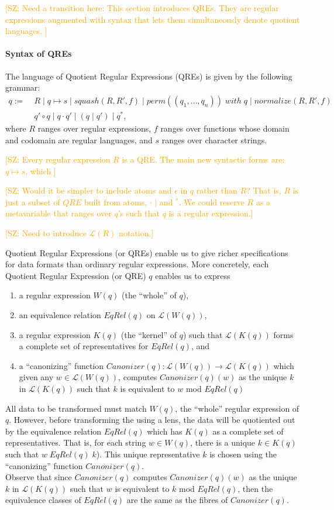 \documentclass{svproc}
\newcommand{\FINISH}[3]{\ifdraft\textcolor{#1}{[#2: #3]}\fi}
\newcommand{\saz}[1]{\FINISH{orange}{SZ}{#1}}
\newcommand{\squash}[3]{\ensuremath{\mathit{squash}(#1, #2, #3)}}
\newcommand{\perm}[2]{\ensuremath{\mathit{perm}(#1)\; \mathit{with}\; #2}}
\newcommand{\normalize}[3]{\ensuremath{\mathit{normalize}(#1, #2, #3)}}
\newcommand{\sep}{\ensuremath{\; | \;}}
\begin{document}
\saz{Need a transition here:  This section introduces QREs.  They are regular
  expressions augmented with syntax that lets them simultaneously denote
  quotient languages.  
   }

  \paragraph{Syntax of QREs}
The language of Quotient Regular Expressions (QREs) is given by the following
grammar:
\begin{align*}
q := \; &R \sep q \mapsto s \sep \squash{R}{R'}{f} \sep
\perm{(q_1, \ldots, q_n)}{q} \;  | \; \normalize{R}{R'}{f}\\
&q' \circ q \sep q \cdot q' \sep (q \sep q') \sep q^*,
\end{align*}
where $R$ ranges over regular expressions, $f$ ranges over functions whose
domain and codomain are regular languages, and $s$ ranges over character
strings.

\saz{  Every regular expression $R$ is a QRE.  The main new syntactic forms are: $q \mapsto s$, which
}

\saz{Would it be simpler to include atoms and $\epsilon$ in $q$ rather than $R$?  That is, $R$ is
  just a subset of $QRE$ built from atoms, $\cdot$ $|$ and ${}^*$.  We could
  reserve $R$ as a metavariable that ranges over $q$'s such that $q$ is a
  regular expression.}

\saz{Need to introduce $\mathcal{L}(R)$ notation.}

Quotient Regular Expressions (or QREs) enable us to give richer specifications
for data formats than ordinary regular expressions. More concretely, each
Quotient Regular Expression (or QRE) $q$ enables us to express
\begin{enumerate}
  \item a regular expression $W(q)$ (the ``whole'' of $q$),
  \item an equivalence relation $EqRel(q)$ on $\mathcal{L}(W(q))$,
  \item a regular expression $K(q)$ (the ``kernel'' of $q$)
  such that $\mathcal{L}(K(q))$ forms a complete set of representatives for
  $EqRel(q)$, and
  \item a ``canonizing'' function $Canonizer(q):\mathcal{L}(W(q))
  \longrightarrow \mathcal{L}(K(q))$ which given any $w \in \mathcal{L}(W(q))$,
  computes $Canonizer(q)(w)$ as the unique $k$ in $\mathcal{L}(K(q))$ such that
  $k$ is equivalent to $w$ mod $EqRel(q)$
  \end{enumerate}
  All data to be transformed must match $W(q)$, the ``whole'' regular
  expression of $q$. However, before transforming the using a lens, the data
  will be quotiented out by the equivalence relation $EqRel(q)$ which has $K(q)$
  as a complete set of representatives. That is, for each string $w \in
  W(q)$, there is a unique $k \in K(q)$ such that $w \; EqRel(q) \; k$). This
  unique representative $k$ is chosen using the ``canonizing'' function
  $Canonizer(q)$.\\
  Observe that since $Canonizer(q)$ computes $Canonizer(q)(w)$ as the unique $k$
  in $\mathcal{L}(K(q))$ such that $w$ is equivalent to $k$ mod $EqRel(q)$,
  then the equivalence classes of $EqRel(q)$ are the same as the fibres of
  $Canonizer(q)$.
\end{document}
